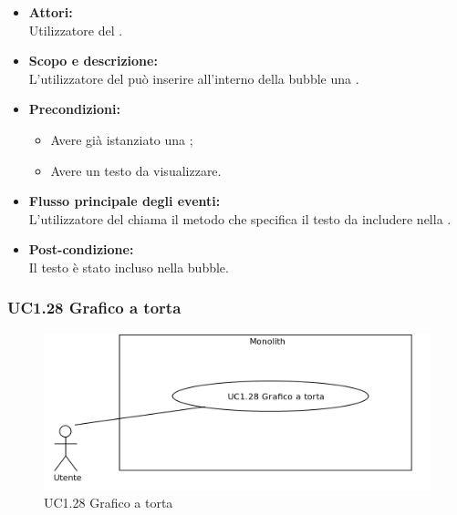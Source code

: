 \begin{itemize}
	\item \textbf{Attori:}
	\\Utilizzatore del .
	\item \textbf{Scopo e descrizione:} 
	\\L’utilizzatore del  può inserire all'interno della bubble una .
	\item \textbf{Precondizioni:}
	\begin{itemize}
		\item Avere già istanziato una ;
		\item Avere un testo da visualizzare.
	\end{itemize}
	\item \textbf{Flusso principale degli eventi:}
	\\L’utilizzatore del  chiama il metodo che specifica il testo da includere nella .
	\item \textbf{Post-condizione:}
	\\Il testo è stato incluso nella bubble.
\end{itemize}

\subsubsection{UC1.28 Grafico a torta} \label{UC1.28}

\begin{figure}[H]
	\centering
	\includegraphics[width=15cm]{../../documenti/AnalisiDeiRequisiti/Diagrammi_img/uc1_28.png}
	\caption{UC1.28 Grafico a torta}
\end{figure}

